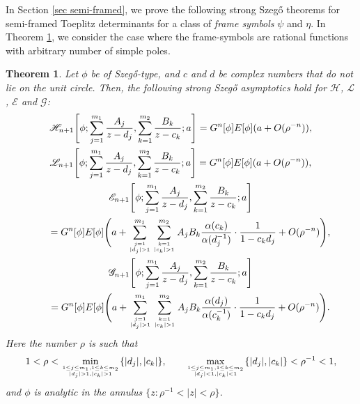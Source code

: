 \documentclass[10pt,a4paper]{amsart}
\numberwithin{equation}{section}
\newtheorem{Theorem}{Theorem}[section]
\newcommand{\al}{\alpha}
\newcommand{\di}{\displaystyle}
\begin{document}
In Section \ref{sec semi-framed}, we prove the following strong Szeg\H{o} theorems for semi-framed Toeplitz determinants for a class of \textit{frame symbols} $\psi$ and $\eta$. In Theorem \ref{thm semi-framed rationals intro}, we consider the case where the frame-symbols are rational functions with arbitrary number of simple poles.
	

	\begin{Theorem}\label{thm semi-framed rationals intro}
		Let $\phi$ be of Szeg\H{o}-type, and $c$ and $d$ be complex numbers that do not lie on the unit circle. Then, the following strong Szeg\H{o} asymptotics hold for $\mathscr{H}$, $\mathscr{L}$, $\mathscr{E}$ and $\mathscr{G}$:
		\begin{gather}
			\mathscr{H}_{n+1}\Bigg[\phi; \di \sum_{j=1}^{m_1} \di \frac{A_j}{z-d_j}, \sum_{k=1}^{m_2} \di \frac{B_k}{z-c_k};a\Bigg] = G^n[\phi] E[\phi] (a + O(\rho^{-n})),\label{asymp H rationals lin comb}	
\\
			\mathscr{L}_{n+1}\Bigg[\phi; \di \sum_{j=1}^{m_1} \di \frac{A_j}{z-d_j}, \sum_{k=1}^{m_2} \di \frac{B_k}{z-c_k};a\Bigg] = G^n[\phi] E[\phi] (a + O(\rho^{-n})),\nonumber	
\\
			\mathscr{E}_{n+1}\Bigg[\phi; \di \sum_{j=1}^{m_1} \di \frac{A_j}{z-d_j}, \sum_{k=1}^{m_2} \di \frac{B_k}{z-c_k};a\Bigg] \nonumber \\
\qquad= G^n[\phi] E[\phi] \Bigg( a + \sum^{m_1}_{j=1 \atop |d_j|>1 } \sum^{m_2}_{k=1 \atop |c_k|>1 } A_jB_k \frac{\al(c_k)}{\al(d_j^{-1})}\cdot \frac{1}{1-c_kd_j} +O(\rho^{-n}) \Bigg),\nonumber	
\\
			\mathscr{G}_{n+1}\Bigg[\phi; \di \sum_{j=1}^{m_1} \di \frac{A_j}{z-d_j}, \sum_{k=1}^{m_2} \di \frac{B_k}{z-c_k};a\Bigg] \nonumber\\
\qquad= G^n[\phi] E[\phi] \Bigg( a + \sum^{m_1}_{j=1 \atop |d_j|>1 } \sum^{m_2}_{k=1 \atop |c_k|>1 } A_jB_k \frac{\al(d_j)}{\al(c_k^{-1})}\cdot \frac{1}{1-c_kd_j} +O(\rho^{-n}) \Bigg).\nonumber
		\end{gather}			
		Here the number $\rho$ is such that
\[1<\rho < \underset{1 \leq j \leq m_1, 1 \leq k \leq m_2 \atop |d_j|>1,|c_k|>1}{\min} \{|d_j|,|c_k|\}, \qquad \underset{1 \leq j \leq m_1, 1 \leq k \leq m_2 \atop |d_j|<1,|c_k|<1}{\max} \{|d_j|,|c_k|\}<\rho^{-1}<1,
\]
 and $\phi$ is analytic in the annulus $\{z\colon \rho^{-1}<|z|<\rho\}$.
	\end{Theorem}
	
\end{document}
